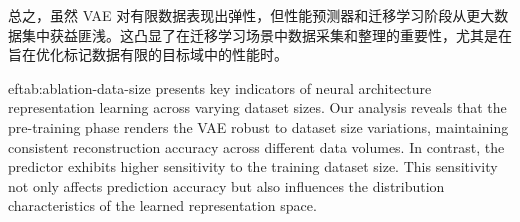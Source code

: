 \documentclass[../main_zh.tex]{subfiles}
\begin{document}
总之，虽然 VAE 对有限数据表现出弹性，但性能预测器和迁移学习阶段从更大数据集中获益匪浅。这凸显了在迁移学习场景中数据采集和整理的重要性，尤其是在旨在优化标记数据有限的目标域中的性能时。





ef{tab:ablation-data-size} presents key indicators of neural architecture representation learning across varying dataset sizes. Our analysis reveals that the pre-training phase renders the VAE robust to dataset size variations, maintaining consistent reconstruction accuracy across different data volumes. In contrast, the predictor exhibits higher sensitivity to the training dataset size. This sensitivity not only affects prediction accuracy but also influences the distribution characteristics of the learned representation space. 

\end{document}
